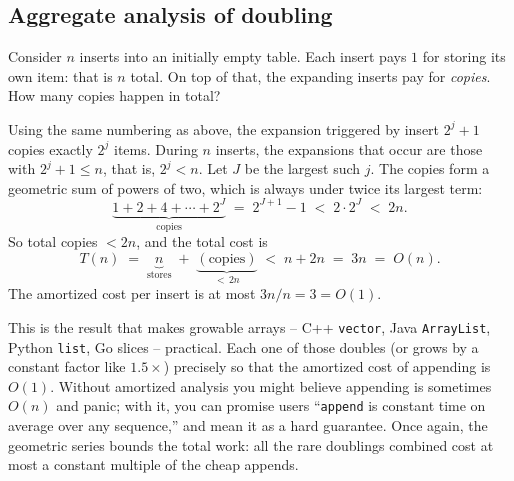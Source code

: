 \subsection{Aggregate analysis of doubling}

Consider $n$ inserts into an initially empty table. Each insert pays $1$ for
storing its own item: that is $n$ total. On top of that, the expanding inserts pay
for \emph{copies}. How many copies happen in total?

Using the same numbering as above, the expansion triggered by insert $2^j + 1$
copies exactly $2^j$ items. During $n$ inserts, the expansions that occur are
those with $2^j + 1 \le n$, that is, $2^j < n$. Let $J$ be the largest such $j$.
The copies form a geometric sum of powers of two, which is always under
twice its largest term:
\[
  \underbrace{1 + 2 + 4 + \cdots + 2^{J}}_{\text{copies}}
  \;=\; 2^{J+1} - 1 \;<\; 2 \cdot 2^{J} \;<\; 2n.
\]
So total copies $< 2n$, and the total cost is
\[
  T(n) \;=\; \underbrace{n}_{\text{stores}} \;+\; \underbrace{(\text{copies})}_{<\,2n}
  \;<\; n + 2n \;=\; 3n \;=\; O(n).
\]
The amortized cost per insert is at most $3n/n = 3 = O(1)$.

\begin{aestheticbox}
This is the result that makes growable arrays -- C++ \texttt{vector}, Java
\texttt{ArrayList}, Python \texttt{list}, Go slices -- practical. Each one of those
doubles (or grows by a constant factor like $1.5\times$) precisely so that the
amortized cost of appending is $O(1)$. Without amortized analysis you might believe
appending is sometimes $O(n)$ and panic; with it, you can promise users
``\texttt{append} is constant time on average over any sequence,'' and mean it as a
hard guarantee. Once again, the geometric series bounds the total work: all the rare doublings
combined cost at most a constant multiple of the cheap appends.
\end{aestheticbox}

